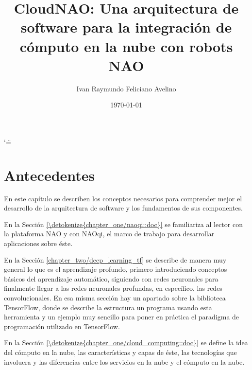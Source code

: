 \documentclass[letterpaper,12pt,spanish]{report}
\title{CloudNAO: Una arquitectura de software para la integración de
cómputo en la nube con robots NAO}
\date{\today}
\author{Ivan Raymundo Feliciano Avelino}
\begin{document}
\ifnum\catcode`\"=\active{}\fi
\maketitle
\sphinxtableofcontents








\chapter{Antecedentes}
\label{\detokenize{chapter_one:antecedentes}}\label{\detokenize{chapter_one::doc}}

En este capítulo se describen los conceptos 
necesarios para comprender mejor el desarrollo
de la arquitectura de software y los fundamentos
de sus componentes. 

En la Sección \ref{\detokenize{chapter_one/naoqi::doc}} se 
familiariza al lector con la plataforma NAO y con
NAOqi, el marco de trabajo para desarrollar
aplicaciones sobre éste. 

En la Sección \ref{chapter_two/deep_learning_tf} se describe 
de manera muy general lo que es el aprendizaje profundo,
primero introduciendo conceptos básicos del aprendizaje 
automático, siguiendo con redes neuronales para finalmente
llegar a las redes neuronales profundas, en específico,
las redes convolucionales. En esa misma sección
hay un apartado sobre la biblioteca TensorFlow,
donde se describe la estructura un programa
usando esta herramienta y un ejemplo muy
sencillo para poner en práctica el paradigma de programación utilizado
en TensorFlow.

En la Sección \ref{\detokenize{chapter_one/cloud_computing::doc}}
se define la idea del cómputo en la nube, las características y capas de éste, 
las tecnologías que involucra y las diferencias entre los servicios
en la nube y el cómputo en la nube.
\end{document}
